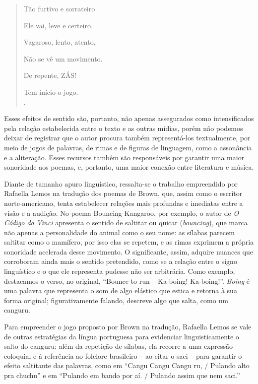 \documentclass[portuguese]{textolivre}
\begin{document}
\begin{minipage}{\textwidth}
\begin{quote}
Tão furtivo e sorrateiro
    
Ele vai, leve e certeiro.

Vagaroso, lento, atento,

Não se vê um movimento.

De repente, ZÁS!

Tem início o jogo. \\
\cite[s/p, destaque do autor]{brown_sinfonia_2020}.
\end{quote}
\vspace{1em}
\end{minipage}

Esses efeitos de sentido são, portanto, não apenas assegurados como
intensificados pela relação estabelecida entre o texto e as outras mídias,
porém não podemos deixar de registrar que o autor procura também representá-los
textualmente, por meio de jogos de palavras, de rimas e de figuras de
linguagem, como a assonância e a aliteração. Esses recursos também são
responsáveis por garantir uma maior sonoridade aos poemas, e, portanto, uma
maior conexão entre literatura e música.

Diante de tamanho apuro linguístico, ressalta-se o trabalho empreendido por
Rafaella Lemos na tradução dos poemas de Brown, que, assim como o escritor
norte-americano, tenta estabelecer relações mais profundas e imediatas entre a
visão e a audição. No poema Bouncing Kangaroo, por exemplo, o autor de
\textit{O Código da Vinci} apresenta o sentido de saltitar ou quicar
(\textit{bouncing}), que marca não apenas a personalidade do animal como o seu
nome: as sílabas parecem saltitar como o mamífero, por isso elas se repetem, e
as rimas exprimem a própria sonoridade acelerada desse movimento. O
significante, assim, adquire nuances que corroboram ainda mais o sentido
pretendido, como se a relação entre o signo linguístico e o que ele representa
pudesse não ser arbitrária. Como exemplo, destacamos o verso, no original,
“Bounce to run – Ka-boing! Ka-boing!”. \textit{Boing} é uma palavra que
representa o som de algo elástico que estica e retorna à sua forma original;
figurativamente falando, descreve algo que salta, como um canguru. 

Para empreender o jogo proposto por Brown na tradução, Rafaella Lemos se vale
de outras estratégias da língua portuguesa para evidenciar linguisticamente o
salto do canguru: além da repetição de sílabas, ela recorre a uma expressão
coloquial e à referência ao folclore brasileiro – ao citar o saci – para
garantir o efeito saltitante das palavras, como em “Cangu Cangu Cangu ru, /
Pulando alto pra chuchu” e em “Pulando em bando por aí. / Pulando assim que nem
saci.”
\end{document}
